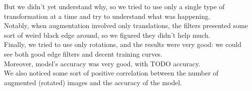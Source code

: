 \documentclass{report}
\begin{document}
But we didn't yet understand why, so we tried to use only a single type of transformation at a time and try to understand what was happening.\\
Notably, when augmentation involved only translations, the filters presented some sort of weird black edge around, so we figured they didn't help much.\\

Finally, we tried to use only rotations, and the results were very good: we could see both good edge filters and decent training curves.\\
Moreover, model's accuracy was very good, with TODO accuracy.\\
We also noticed some sort of positive correlation between the number of augmented (rotated) images and the accuracy of the model.\\
\end{document}
